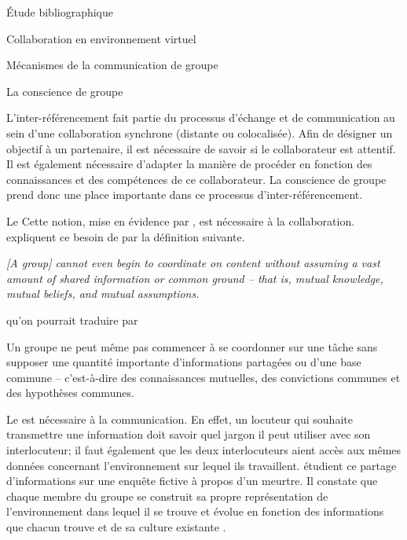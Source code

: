 \documentclass[myfrancais,ngerman,english,french]{mythesis}
\begin{document}
\begin{mychapter}{Étude bibliographique}
\begin{mysection}{Collaboration en environnement virtuel}
\begin{mysubsection}{Mécanismes de la communication de groupe}
\begin{mysubsubsection}{La conscience de groupe}
					\begin{myfigure}
					\end{myfigure}

					L'inter-référencement fait partie du processus d'échange et de communication au sein d'une collaboration synchrone (distante ou colocalisée).
					Afin de désigner un objectif à un partenaire, il est nécessaire de savoir si le collaborateur est attentif.
					Il est également nécessaire d'adapter la manière de procéder en fonction des connaissances et des compétences de ce collaborateur.
					La conscience de groupe prend donc une place importante dans ce processus d'inter-référencement.
				\end{mysubsubsection}
				\begin{mysubsubsection}{Le \mygrounding}
					Cette notion, mise en évidence par , est nécessaire à la collaboration.
					 expliquent ce besoin de \mygrounding par la définition suivante.
					\begin{myquote}[english]
						\it [A group] cannot even begin to coordinate on content without assuming a vast amount of shared information or common ground -- that is, mutual knowledge, mutual beliefs, and mutual assumptions.
					\end{myquote}
					qu'on pourrait traduire par
					\begin{myquote}[french]
						Un groupe ne peut même pas commencer à se coordonner sur une tâche sans supposer une quantité importante d'informations partagées ou d'une base commune -- c'est-à-dire des connaissances mutuelles, des convictions communes et des hypothèses communes.
					\end{myquote}

					Le \mygrounding est nécessaire à la communication.
					En effet, un locuteur qui souhaite transmettre une information doit savoir quel jargon il peut utiliser avec son interlocuteur; il faut également que les deux interlocuteurs aient accès aux mêmes données concernant l'environnement sur lequel ils travaillent.
					 étudient ce partage d'informations sur une enquête fictive à propos d'un meurtre.
					Il constate que chaque membre du groupe se construit sa propre représentation de l'environnement dans lequel il se trouve et évolue en fonction des informations que chacun trouve et de sa culture existante .


\end{mysubsubsection}
\end{mysubsection}
\end{mysection}
\end{mychapter}
\end{document}
